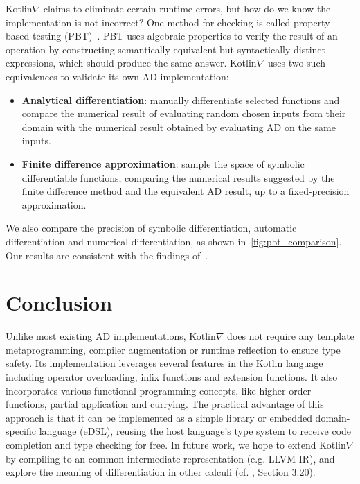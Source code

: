 \documentclass{article}
\begin{document}
Kotlin$\nabla$ claims to eliminate certain runtime errors, but how do we know the implementation is not incorrect? One method for checking is called property-based testing (PBT)~\citep{fink1997property}. PBT uses algebraic properties to verify the result of an operation by constructing semantically equivalent but syntactically distinct expressions, which should produce the same answer. Kotlin$\nabla$ uses two such equivalences to validate its own AD implementation: \\
%
\begin{itemize}
    \item \textbf{Analytical differentiation}: manually differentiate selected functions and compare the numerical result of evaluating random chosen inputs from their domain with the numerical result obtained by evaluating AD on the same inputs.
    \item \textbf{Finite difference approximation}: sample the space of symbolic differentiable functions, comparing the numerical results suggested by the finite difference method and the equivalent AD result, up to a fixed-precision approximation. \\
\end{itemize}

We also compare the precision of symbolic differentiation, automatic differentiation and numerical differentiation, as shown in~\autoref{fig:pbt_comparison}. Our results are consistent with the findings of~\citet{laue2019equivalence}.

\section{Conclusion}

Unlike most existing AD implementations, Kotlin$\nabla$ does not require any template metaprogramming, compiler augmentation or runtime reflection to ensure type safety. Its implementation leverages several features in the Kotlin language including operator overloading, infix functions and extension functions. It also incorporates various functional programming concepts, like higher order functions, partial application and currying. The practical advantage of this approach is that it can be implemented as a simple library or embedded domain-specific language (eDSL), reusing the host language's type system to receive code completion and type checking for free. In future work, we hope to extend Kotlin$\nabla$ by compiling to an common intermediate representation (e.g. LLVM IR), and explore the meaning of differentiation in other calculi (cf. \citet{considine2019programming}, Section 3.20).



\end{document}
